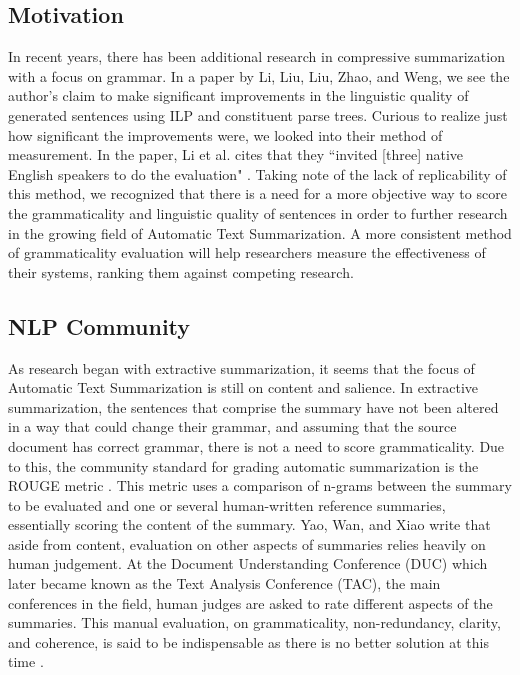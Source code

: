 \documentclass[11pt,a4paper]{article}
\begin{document}
\begin{multicols}{2}
\subsection{Motivation}
In recent years, there has been additional research in compressive summarization with a focus on grammar. In a paper by Li, Liu, Liu, Zhao, and Weng, we see the author's claim to make significant improvements in the linguistic quality of generated sentences using ILP and constituent parse trees. \cite{li2014} Curious to realize just how significant the improvements were, we looked into their method of measurement. In the paper, Li et al. cites that they ``invited [three] native English speakers to do the evaluation" \cite{li2014}. Taking note of the lack of replicability of this method, we recognized that there is a need for a more objective way to score the grammaticality and linguistic quality of sentences in order to further research in the growing field of Automatic Text Summarization. A more consistent method of grammaticality evaluation will help researchers measure the effectiveness of their systems, ranking them against competing research.

\subsection{NLP Community}
As research began with extractive summarization, it seems that the focus of Automatic Text Summarization is still on content and salience. In extractive summarization, the sentences that comprise the summary have not been altered in a way that could change their grammar, and assuming that the source document has correct grammar, there is not a need to score grammaticality. Due to this, the community standard for grading automatic summarization is the ROUGE metric \cite{yao2017}. This metric uses a comparison of n-grams between the summary to be evaluated and one or several human-written reference summaries, essentially scoring the content of the summary. Yao, Wan, and Xiao write that aside from content, evaluation on other aspects of summaries relies heavily on human judgement. At the Document Understanding Conference (DUC) which later became known as the Text Analysis Conference (TAC), the main conferences in the field, human judges are asked to rate different aspects of the summaries. This manual evaluation, on grammaticality, non-redundancy, clarity, and coherence, is said to be indispensable as there is no better solution at this time \cite{yao2017}.


\end{multicols}
\end{document}
